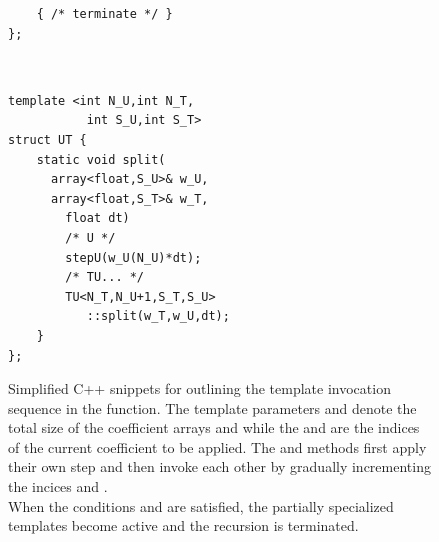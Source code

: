 \begin{figure}[ht]
\begin{minipage}[c]{\textwidth}
\begin{minipage}[r][10cm][t]{.4\textwidth}
\begin{minipage}[t]{\textwidth}
\begin{lstlisting}
	{ /* terminate */ }
};
\end{lstlisting}
			\end{minipage} \\
			\vspace{5mm}
			\begin{minipage}[t]{\textwidth}
\begin{lstlisting}
template <int N_U,int N_T,
           int S_U,int S_T>
struct UT {
	static void split(
	  array<float,S_U>& w_U,
	  array<float,S_T>& w_T,
		float dt)
		/* U */
		stepU(w_U(N_U)*dt);
		/* TU... */
		TU<N_T,N_U+1,S_T,S_U>
		   ::split(w_T,w_U,dt);
	}
};
\end{lstlisting}
			\end{minipage}
	\end{minipage}
	\end{minipage}
	\caption{Simplified C++ snippets for outlining the template invocation sequence in the  function. The template parameters  and  denote the total size of the coefficient arrays  and  while the  and  are the indices of the current coefficient to be applied. The  and  methods first apply their own step and then invoke each other by gradually incrementing the incices  and . \\
	When the conditions  and  are satisfied, the partially specialized templates become active and the recursion is terminated.}
	\label{fig:intsplit}
\end{figure}
